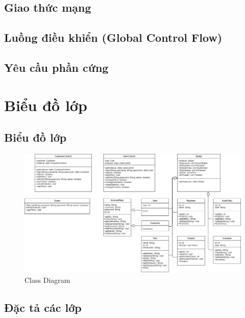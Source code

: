 \documentclass[a4paper, 12pt]{article}
\begin{document}
\subsection{Giao thức mạng}

\subsection{Luồng điều khiển (Global Control Flow)}

\subsection{Yêu cầu phần cứng}

\clearpage

\section{Biểu đồ lớp}

\subsection{Biểu đồ lớp}
\begin{figure}[H]
\centering
	\includegraphics[scale=0.37]{image/5.0.png}
	\caption{Class Diagram}
\end{figure}

\subsection{Đặc tả các lớp}
\end{document}
